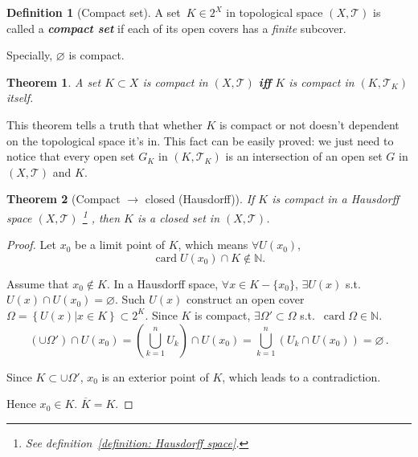 \documentclass[openany]{book}
\newcommand*{\indexbf}[1]{\emph{\textbf{#1}}\index{#1}} %
\theoremstyle{plain}
\newtheorem{theorem}{Theorem}[section] %
\theoremstyle{definition}
\newtheorem{definition}{Definition}[section] %
\newcommand{\emphbf}[1]{\emph{\textbf{#1}}}
\DeclareMathOperator{\card}{card}
\begin{document}
\begin{definition}[Compact set]\label{definition: compact set}
	A set~$K \in 2^X$ in topological space $(X, \mathscr T)$ is called a \indexbf{compact set} if each of its open covers has a \emph{finite} subcover. 
\end{definition}

Specially, $\varnothing$ is compact.

\begin{theorem}\label{theorem: compact iff compact in subspace}
	A set $K \subset X$ is compact in $(X,\mathscr T)$ \emphbf{iff} $K$ is compact in $(K, \mathscr T_K)$ itself. 
\end{theorem}

This theorem tells a truth that whether $K$ is compact or not doesn't dependent on the topological space it's in. 
This fact can be easily proved: we just need to notice that every open set $G_K$ in $(K, \mathscr T_K)$ is an intersection of an open set $G$ in $(X, \mathscr T)$ and $K$. 

\begin{theorem}[Compact $\to$ closed (Hausdorff)]\label{theorem: compact sets are closed in Hausdorff space}
	If $K$ is compact in a Hausdorff space $(X, \mathscr T)$%
		\footnote{See definition~\ref{definition: Hausdorff space}. }%
	, then $K$ is a closed set in $(X, \mathscr T)$.
\end{theorem}
\begin{proof}
	Let $x_0$ be a limit point of $K$, which means $\forall U(x_0)$, 
	\[
		\card U(x_0)\cap K \notin \mathbb{N}.
	\]

	Assume that $x_0 \notin K$. 
	In a Hausdorff space, $\forall x \in K - \{x_0\}$, $\exists U(x)$ s.t. $U(x)\cap U(x_0)=\varnothing$. 
	Such $U(x)$ construct an open cover $\varOmega=\left\{U(x)|x\in K \right\}\subset 2^K$. 
	Since $K$ is compact, $\exists \varOmega' \subset \varOmega$ s.t.\ $\card \Omega \in \mathbb{N}$. 
	\[
		\left(\cup\Omega'\right)
		\cap U(x_0)
		=
		\left(\bigcup_{k=1}^n{U_k}\right)
		\cap U(x_0)
		=
		\bigcup_{k=1}^n\left(
			U_k\cap U(x_0)
		\right)
		=
		\varnothing\,.
	\]

	Since $K\subset \cup \Omega'$, $x_0$ is an exterior point of $K$, which leads to a contradiction. 

	Hence $x_0 \in K$. $\overline K = K$.
\end{proof}
\end{document}
